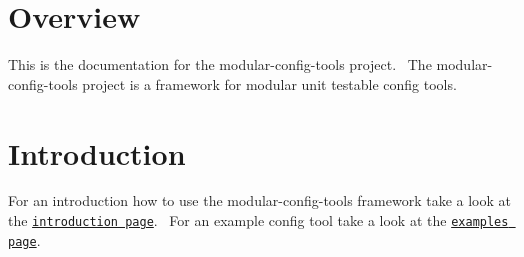 \hypertarget{index_summary}{}\section{Overview}\label{index_summary}
This is the documentation for the modular-\/config-\/tools project.~\newline
 The modular-\/config-\/tools project is a framework for modular unit testable config tools.\hypertarget{index_intro}{}\section{Introduction}\label{index_intro}
For an introduction how to use the modular-\/config-\/tools framework take a look at the \href{md_doc_introduction.html}{\tt introduction page}.~\newline
 For an example config tool take a look at the \href{examples.html}{\tt examples page}. 